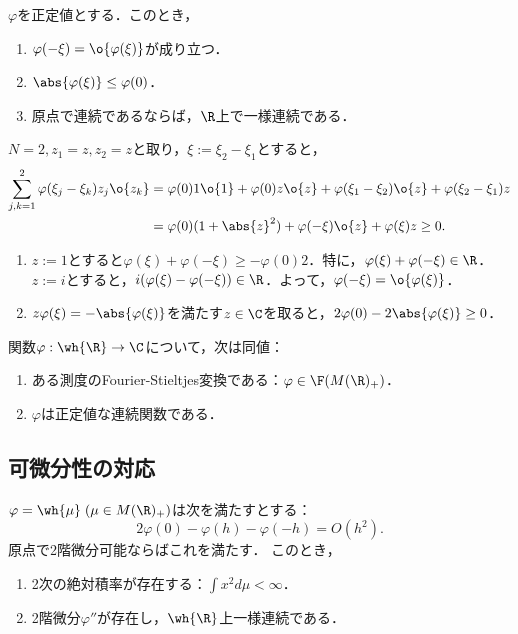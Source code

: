 \documentclass[uplatex,dvipdfmx]{jsreport}
\begin{document}
\begin{proposition}
    $\varphi$を正定値とする．このとき，
    \begin{enumerate}
        \item $\varphi(-\xi)=\o{\varphi(\xi)}$が成り立つ．
        \item $\abs{\varphi(\xi)}\le\varphi(0)$．
        \item 原点で連続であるならば，$\R$上で一様連続である．
    \end{enumerate}
\end{proposition}
\begin{Proof}
    $N=2,z_1=z,z_2=z$と取り，$\xi:=\xi_2-\xi_1$とすると，
    \begin{align*}
        \sum_{j,k=1}^2\varphi(\xi_j-\xi_k)z_j\o{z_k}&=\varphi(0)1\o{1}+\varphi(0)z\o{z}+\varphi(\xi_1-\xi_2)\o{z}+\varphi(\xi_2-\xi_1)z\\
        &=\varphi(0)(1+\abs{z}^2)+\varphi(-\xi)\o{z}+\varphi(\xi)z\ge0.
    \end{align*}
    \begin{enumerate}
        \item $z:=1$とすると$\varphi(\xi)+\varphi(-\xi)\ge-\varphi(0)2$．特に，$\varphi(\xi)+\varphi(-\xi)\in\R$．
        $z:=i$とすると，$i(\varphi(\xi)-\varphi(-\xi))\in\R$．よって，$\varphi(-\xi)=\o{\varphi(\xi)}$．
        \item $z\varphi(\xi)=-\abs{\varphi(\xi)}$を満たす$z\in\C$を取ると，$2\varphi(0)-2\abs{\varphi(\xi)}\ge0$．
    \end{enumerate}
\end{Proof}

\begin{theorem}[Bochner]
    関数$\varphi:\wh{\R}\to\C$について，次は同値：
    \begin{enumerate}
        \item ある測度のFourier-Stieltjes変換である：$\varphi\in\F(M(\R)_+)$．
        \item $\varphi$は正定値な連続関数である．
    \end{enumerate}
\end{theorem}

\subsection{可微分性の対応}

\begin{lemma}
    $\varphi=\wh{\mu}\;(\mu\in M(\R)_+)$は次を満たすとする：
    \[2\varphi(0)-\varphi(h)-\varphi(-h)=O(h^2).\]
    原点で2階微分可能ならばこれを満たす．
    このとき，
    \begin{enumerate}
        \item 2次の絶対積率が存在する：$\int x^2d\mu<\infty$．
        \item 2階微分$\varphi''$が存在し，$\wh{\R}$上一様連続である．
    \end{enumerate}
\end{lemma}
\end{document}
